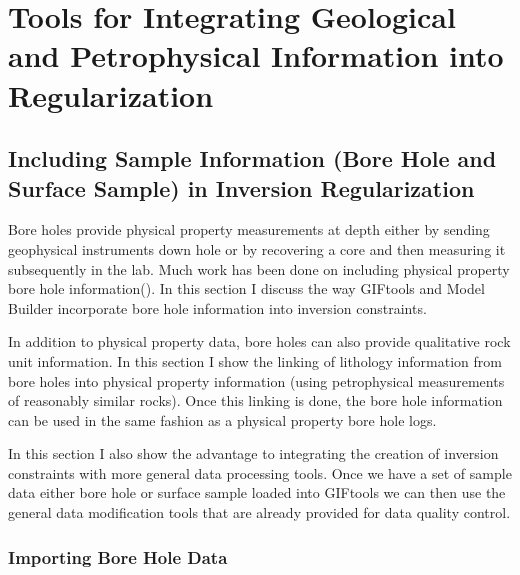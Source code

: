 
\chapter{Tools for Integrating Geological and Petrophysical Information into Regularization}
\label{ch:GIFtools}

\section{Including Sample Information (Bore Hole and Surface Sample) in Inversion Regularization}
\label{sec:BHandSS}

Bore holes provide physical property measurements at depth either by sending geophysical instruments down hole or by recovering a core and then measuring it subsequently in the lab.  Much work has been done on including physical property bore hole information(\cite{williams2008geologically}). In this section I discuss the way GIFtools and Model Builder incorporate bore hole information into inversion constraints.

In addition to physical property data, bore holes can also provide qualitative rock unit information. In this section I show the linking of lithology information from bore holes into physical property information (using petrophysical measurements of reasonably similar rocks). Once this linking is done,  the bore hole information can be used in the same fashion as a physical property bore hole logs.

In this section I also show the advantage to integrating the creation of inversion constraints with more general data processing tools. Once we have a set of sample data either bore hole or surface sample loaded into GIFtools we can then use the general data modification tools that are already provided for data quality control.

\subsection{Importing Bore Hole Data}
\label{subsec:importBH}

